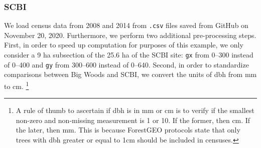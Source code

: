 \documentclass[12pt]{article}
\newenvironment{Shaded}{\begin{snugshade}}{\end{snugshade}}
\newcommand{\CommentTok}[1]{\textcolor[rgb]{0.56,0.35,0.01}{\textit{#1}}}
\newcommand{\DataTypeTok}[1]{\textcolor[rgb]{0.13,0.29,0.53}{#1}}
\newcommand{\DecValTok}[1]{\textcolor[rgb]{0.00,0.00,0.81}{#1}}
\newcommand{\KeywordTok}[1]{\textcolor[rgb]{0.13,0.29,0.53}{\textbf{#1}}}
\newcommand{\NormalTok}[1]{#1}
\newcommand{\OperatorTok}[1]{\textcolor[rgb]{0.81,0.36,0.00}{\textbf{#1}}}
\newcommand{\StringTok}[1]{\textcolor[rgb]{0.31,0.60,0.02}{#1}}
\begin{document}
\begin{Shaded}
\end{Shaded}

\hypertarget{scbi-data}{%
\subsubsection{SCBI}\label{scbi-data}}

We load census data from 2008 and 2014 from \texttt{.csv} files saved
from GitHub on November 20, 2020. Furthermore, we perform two additional
pre-processing steps. First, in order to speed up computation for
purposes of this example, we only consider a 9 ha subsection of the 25.6
ha of the SCBI site: \texttt{gx} from 0--300 instead of 0--400 and
\texttt{gy} from 300--600 instead of 0--640. Second, in order to
standardize comparisons between Big Woods and SCBI, we convert the units
of dbh from mm to cm. \footnote{A rule of thumb to ascertain if dbh is
  in mm or cm is to verify if the smallest non-zero and non-missing
  measurement is 1 or 10. If the former, then cm. If the later, then mm.
  This is because ForestGEO protocols state that only trees with dbh
  greater or equal to 1cm should be included in censuses. }
\end{document}
